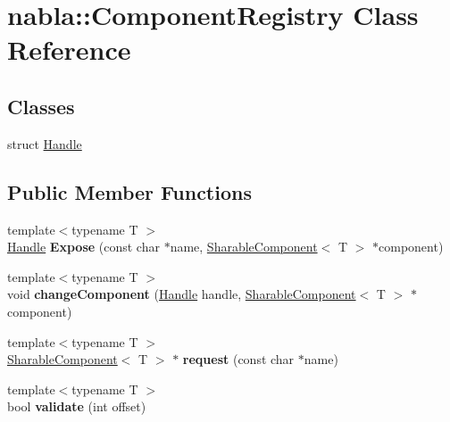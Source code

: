\hypertarget{classnabla_1_1_component_registry}{}\section{nabla\+::Component\+Registry Class Reference}
\label{classnabla_1_1_component_registry}
\subsection*{Classes}
\begin{DoxyCompactItemize}
\item 
struct \mbox{\hyperlink{structnabla_1_1_component_registry_1_1_handle}{Handle}}
\end{DoxyCompactItemize}
\subsection*{Public Member Functions}
\begin{DoxyCompactItemize}
\item 
\mbox{\label{classnabla_1_1_component_registry_a776156940c82f102cbcfc7e0fbd2030b}} 
{\footnotesize template$<$typename T $>$ }\\\mbox{\hyperlink{structnabla_1_1_component_registry_1_1_handle}{Handle}} {\bfseries Expose} (const char $\ast$name, \mbox{\hyperlink{structnabla_1_1_sharable_component}{Sharable\+Component}}$<$ T $>$ $\ast$component)
\item 
\mbox{\label{classnabla_1_1_component_registry_ac6ea0dbc1f8d059e5344a23507a5ad6f}} 
{\footnotesize template$<$typename T $>$ }\\void {\bfseries change\+Component} (\mbox{\hyperlink{structnabla_1_1_component_registry_1_1_handle}{Handle}} handle, \mbox{\hyperlink{structnabla_1_1_sharable_component}{Sharable\+Component}}$<$ T $>$ $\ast$component)
\item 
\mbox{\label{classnabla_1_1_component_registry_aa61c3930a419c090e7ed649dd87af063}} 
{\footnotesize template$<$typename T $>$ }\\\mbox{\hyperlink{structnabla_1_1_sharable_component}{Sharable\+Component}}$<$ T $>$ $\ast$ {\bfseries request} (const char $\ast$name)
\item 
\mbox{\label{classnabla_1_1_component_registry_a192ab752b97fe4b9be910645b2167a3e}} 
{\footnotesize template$<$typename T $>$ }\\bool {\bfseries validate} (int offset)
\end{DoxyCompactItemize}
